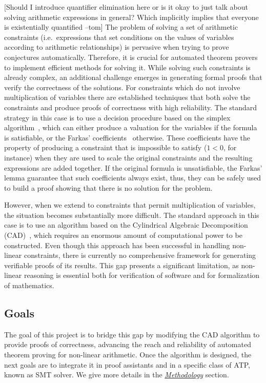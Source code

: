 \documentclass[a4paper, 12pt]{article}
\newcommand{\yell}[1]{{\color{blue} [#1]}}
\newcommand{\tom}[1]{\yell{#1 --tom}}
\begin{document}
\tom{Should I introduce quantifier elimination here or is it okay to just talk about
  solving arithmetic expressions in general? Which implicitly implies that everyone
  is existentially quantified}
The problem of solving a set of arithmetic constraints (i.e.\ expressions that set conditions
on the values of variables according to arithmetic relationships) is pervasive when trying to
prove conjectures automatically. Therefore, it is crucial for automated theorem provers to
implement efficient methods for solving it.
%
While solving such constraints is already complex, an additional challenge emerges in generating
formal proofs that verify the correctness of the solutions.
%
For constraints which do not involve multiplication of variables there are established techniques
that both solve the constraints and produce proofs of correctness with high reliability.
%
The standard strategy in this case is to use a decision procedure based on the simplex algorithm~\cite{simplex_dpllt}, which can either produce a valuation for the variables if the formula
is satisfiable, or the Farkas' coefficients~\cite{farkas_ref} otherwise.
%
These coefficients have the property of producing a constraint that is impossible to satisfy
($1 < 0$, for instance) when they are used to scale the original constraints and the resulting
expressions are added together.
%
If the original formula is unsatisfiable, the Farkas' lemma guarantee that such coefficients always
exist, thus, they can be safely used to build a proof showing that there is no solution for the problem.

However, when we extend to constraints that permit multiplication of variables,
the situation becomes substantially more difficult. The standard approach in this case
is to use an algorithm based on the Cylindrical Algebraic Decomposition (CAD)~\cite{col75},
which requires an enormous amount of computational power to be constructed. Even though
this approach has been successful in handling non-linear constraints, there is currently
no comprehensive framework for generating verifiable proofs of its results. This gap presents
a significant limitation, as non-linear reasoning is essential both for verification of
software and for formalization of mathematics.

\subsection{Goals}

The goal of this project is to bridge this gap by modifying the CAD algorithm to provide
proofs of correctness, advancing the reach and reliability of automated theorem proving
for non-linear arithmetic. Once the algorithm is designed, the next goals
are to integrate it in proof assistants and in a specific class of ATP, known as SMT solver.
We give more details in the \hyperref[sec:methodology]{\textit{Methodology}} section.
\end{document}
